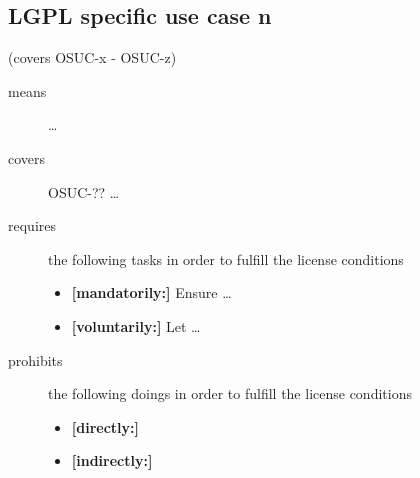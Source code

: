 \subsection{LGPL specific use case n}
(covers OSUC-x - OSUC-z)
\begin{description}
\item[means] \ldots

\item[covers] OSUC-?? \ldots

\item[requires] the following tasks in order to fulfill the license conditions
\begin{itemize}
  \item \textbf{[mandatorily:]} Ensure \ldots
  \item \textbf{[voluntarily:]} Let \ldots
\end{itemize}

\item[prohibits] the following doings in order to fulfill the license conditions
\begin{itemize}
  \item \textbf{[directly:]} 
  \item \textbf{[indirectly:]}
\end{itemize}
\end{description}

%
